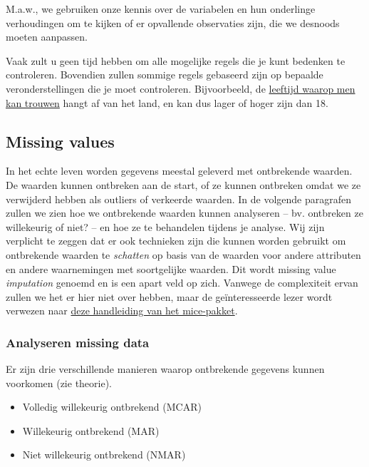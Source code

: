\documentclass[]{tufte-book}
\providecommand{\tightlist}{%
  \setlength{\itemsep}{0pt}\setlength{\parskip}{0pt}}
\begin{document}
M.a.w., we gebruiken onze kennis over de variabelen en hun onderlinge verhoudingen om te kijken of er opvallende observaties zijn, die we desnoods moeten aanpassen.

Vaak zult u geen tijd hebben om alle mogelijke regels die je kunt bedenken te controleren. Bovendien zullen sommige regels gebaseerd zijn op bepaalde veronderstellingen die je moet controleren. Bijvoorbeeld, de \href{https://en.wikipedia.org/wiki/Marriageable_age}{leeftijd waarop men kan trouwen} hangt af van het land, en kan dus lager of hoger zijn dan 18.

\hypertarget{missing-values}{%
\subsection{Missing values}\label{missing-values}}

In het echte leven worden gegevens meestal geleverd met ontbrekende waarden. De waarden kunnen ontbreken aan de start, of ze kunnen ontbreken omdat we ze verwijderd hebben als outliers of verkeerde waarden. In de volgende paragrafen zullen we zien hoe we ontbrekende waarden kunnen analyseren -- bv. ontbreken ze willekeurig of niet? -- en hoe ze te behandelen tijdens je analyse. Wij zijn verplicht te zeggen dat er ook technieken zijn die kunnen worden gebruikt om ontbrekende waarden te \emph{schatten} op basis van de waarden voor andere attributen en andere waarnemingen met soortgelijke waarden. Dit wordt missing value \emph{imputation} genoemd en is een apart veld op zich. Vanwege de complexiteit ervan zullen we het er hier niet over hebben, maar de geïnteresseerde lezer wordt verwezen naar \href{https://datascienceplus.com/imputing-missing-data-with-r-mice-package/}{deze handleiding van het mice-pakket}.

\hypertarget{analyseren-missing-data}{%
\subsubsection{Analyseren missing data}\label{analyseren-missing-data}}

Er zijn drie verschillende manieren waarop ontbrekende gegevens kunnen voorkomen (zie theorie).

\begin{itemize}
\tightlist
\item
  Volledig willekeurig ontbrekend (MCAR)
\item
  Willekeurig ontbrekend (MAR)
\item
  Niet willekeurig ontbrekend (NMAR)
\end{itemize}
\end{document}
